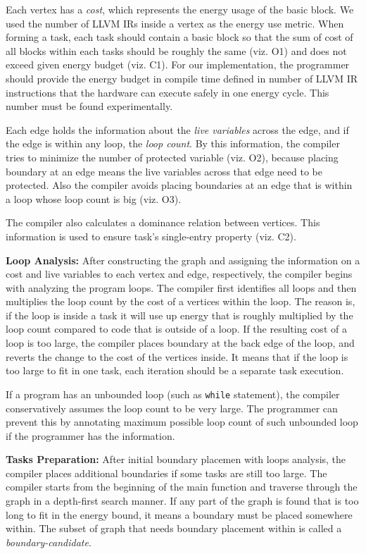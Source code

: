 Each vertex has a {\em cost}, which represents the energy usage of the basic block. We used the number of LLVM IRs inside a vertex as the energy use metric. When forming a task, each task should contain a basic block so that the sum of cost of all blocks within each tasks should be roughly the same (viz. O1) and does not exceed given energy budget (viz. C1). For our implementation, the programmer should provide the energy budget in compile time defined in number of LLVM IR instructions that the hardware can execute safely in one energy cycle. This number must be found experimentally.

Each edge holds the information about the {\em live variables} across the edge, and if the edge is within any loop, the {\em loop count}. By this information, the compiler tries to minimize the number of protected variable (viz. O2), because placing boundary at an edge means the live variables across that edge need to be protected. Also the compiler avoids placing boundaries at an edge that is within a loop whose loop count is big (viz. O3).

The compiler also calculates a dominance relation  between vertices. This information is used to ensure task's single-entry property (viz. C2).

\textbf{Loop Analysis:} After constructing the graph and assigning the information on a cost and live variables to each vertex and edge, respectively, the compiler begins with analyzing the program loops. The compiler first identifies all loops and then multiplies the loop count by the cost of a vertices within the loop. The reason is, if the loop is inside a task it will use up energy that is roughly multiplied by the loop count compared to code that is outside of a loop. If the resulting cost of a loop is too large, the compiler places boundary at the back edge of the loop, and reverts the change to the cost of the vertices inside. It means that if the loop is too large to fit in one task, each iteration should be a separate task execution.

If a program has an unbounded loop (such as {\tt while} statement), the compiler conservatively assumes the loop count to be very large. The programmer can prevent this by annotating maximum possible loop count of such unbounded loop if the programmer has the information.

\textbf{Tasks Preparation:} After initial boundary placemen with loops analysis, the compiler places additional boundaries if some tasks are still too large. The \sys compiler starts from the beginning of the main function and traverse through the graph in a depth-first search manner. If any part of the graph is found that is too long to fit in the energy bound, it means a boundary must be placed somewhere within. The subset of graph that needs boundary placement within is called a {\em boundary-candidate}.

